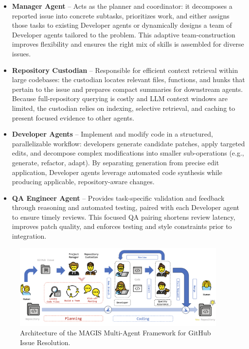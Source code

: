 \begin{itemize}
    \item \textbf{Manager Agent} -- Acts as the planner and coordinator: it decomposes a reported issue into concrete subtasks, prioritizes work, and either assigns those tasks to existing Developer agents or dynamically designs a team of Developer agents tailored to the problem. This adaptive team-construction improves flexibility and ensures the right mix of skills is assembled for diverse issues.
    \item \textbf{Repository Custodian} -- Responsible for efficient context retrieval within large codebases: the custodian locates relevant files, functions, and hunks that pertain to the issue and prepares compact summaries for downstream agents. Because full-repository querying is costly and LLM context windows are limited, the custodian relies on indexing, selective retrieval, and caching to present focused evidence to other agents.
    \item \textbf{Developer Agents} -- Implement and modify code in a structured, parallelizable workflow: developers generate candidate patches, apply targeted edits, and decompose complex modifications into smaller sub-operations (e.g., generate, refactor, adapt). By separating generation from precise edit application, Developer agents leverage automated code synthesis while producing applicable, repository-aware changes.
    \item \textbf{QA Engineer Agent} -- Provides task-specific validation and feedback through reasoning and automated testing, paired with each Developer agent to ensure timely reviews. This focused QA pairing shortens review latency, improves patch quality, and enforces testing and style constraints prior to integration.
\end{itemize}

\begin{figure}[h!]
    \centering
    \includegraphics[width=0.95\textwidth]{figures/magis-architecture.png}
    \caption{Architecture of the MAGIS Multi-Agent Framework for GitHub Issue Resolution.}
    \label{fig:magis_architecture}
\end{figure}

